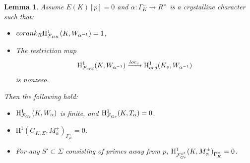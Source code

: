 \documentclass[a4paper,10pt]{amsart}
\numberwithin{equation}{section}
\numberwithin{equation}{section}
\theoremstyle{plain}
\theoremstyle{definition}
\theoremstyle{definition}
\theoremstyle{plain}
\theoremstyle{plain}
\newtheorem{lemma}[thm]{Lemma}
\theoremstyle{plain}
\theoremstyle{plain}
\newcommand{\Z}{\mathbb{Z}}
\newcommand{\Fcal}{\mathcal{F}}
\newcommand{\rH}{\mathrm{H}}
\begin{document}




\begin{lemma}\label{lem:coinv}
Assume $E(K)[p]=0$ and $\alpha:\Gamma_K^-\rightarrow R^\times$ is a crystalline character such that:
\begin{itemize}
\item[(a)] ${\rm corank}_{R}\rH^1_{\Fcal_{\rm BK}}(K,W_{\alpha^{-1}})=1$,
\item[(b)] The restriction map
\[
\rH^1_{\Fcal_{\rm ord}}(K,W_{\alpha^{-1}})\xrightarrow{{\rm loc}_v}\rH^1_{\rm ord}(K_v,W_{\alpha^{-1}})
\]
is nonzero. 
\end{itemize}
Then the following hold:
\begin{itemize}
\item[(i)] $\rH^1_{\Fcal_{\rm Gr}}(K,W_\alpha)$ is finite, and  $\rH^1_{\Fcal_{\rm Gr}}(K,T_\alpha)=0$.
\item[(ii)] $\rH^1(G_{K,\Sigma},M_\alpha^\pm)_{\Gamma_K^\pm}=0$.
\item[(iii)] For any $S'\subset\Sigma$ consisting of primes away from $p$, $\rH^1_{\Fcal_{\rm Gr}^{S'}}(K,M_\alpha^\pm)_{\Gamma_K^\pm}=0$.
\end{itemize}
\end{lemma}
\end{document}
